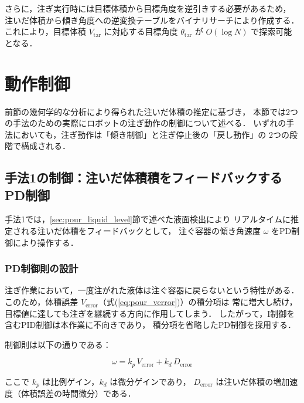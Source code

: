 さらに，注ぎ実行時には目標体積から目標角度を逆引きする必要があるため，
注いだ体積から傾き角度への逆変換テーブルをバイナリサーチにより作成する．
これにより，目標体積 $V_{\mathrm{tar}}$ に対応する目標角度 $\theta_{\mathrm{tar}}$ が
$O(\log N)$ で探索可能となる．


\section{動作制御}
\label{sec:pour_control}

前節の幾何学的な分析により得られた注いだ体積の推定に基づき，
本節では2つの手法のための実際にロボットの注ぎ動作の制御について述べる．
いずれの手法においても，注ぎ動作は「傾き制御」と注ぎ停止後の「戻し動作」の
2つの段階で構成される．

\subsection{手法1の制御：注いだ体積積をフィードバックするPD制御}
\label{sec:pour_method1_pd_control}

手法1では，\ref{sec:pour_liquid_level}節で述べた液面検出により
リアルタイムに推定される注いだ体積をフィードバックとして，
注ぐ容器の傾き角速度 $\omega$ をPD制御により操作する．

\subsubsection{PD制御則の設計}

注ぎ作業において，一度注がれた液体は注ぐ容器に戻らないという特性がある．
このため，体積誤差 $V_{\mathrm{error}}$（式(\ref{eq:pour_verror})）の積分項は
常に増大し続け，目標値に達しても注ぎを継続する方向に作用してしまう．
したがって，I制御を含むPID制御は本作業に不向きであり，
積分項を省略したPD制御を採用する．

制御則は以下の通りである：

\begin{equation}
  \omega = k_p\,V_{\mathrm{error}} + k_d\,D_{\mathrm{error}}
  \label{eq:pour_pd_control}
\end{equation}

ここで $k_p$ は比例ゲイン，$k_d$ は微分ゲインであり，
$D_{\mathrm{error}}$ は注いだ体積の増加速度（体積誤差の時間微分）である．

